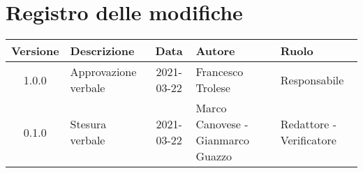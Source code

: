 \section*{Registro delle modifiche}

\begin{center}
	\begin{longtable}{|c|p{4cm}|c|p{3cm}|p{3cm}|}
		\hline
		\rowcolor{lighter-grayer}
		\textbf{Versione} & \textbf{Descrizione} & \textbf{Data} & \textbf{Autore} & \textbf{Ruolo} \\
		\hline
		\endfirsthead


		\hline
		1.0.0 & Approvazione verbale & 2021-03-22 & Francesco Trolese & Responsabile \\
		0.1.0 & Stesura verbale & 2021-03-22 & Marco Canovese - Gianmarco Guazzo & Redattore - Verificatore \\
		\hline
	\end{longtable}
\end{center}